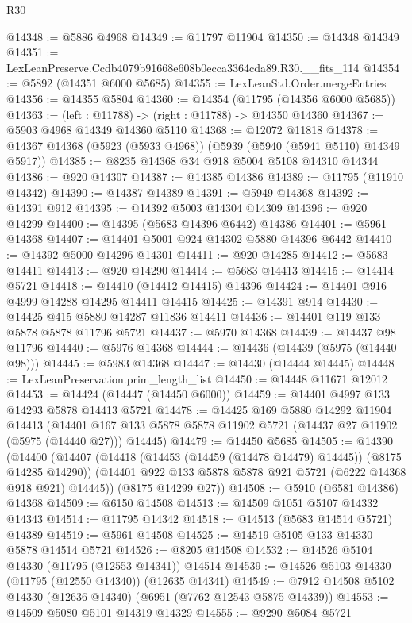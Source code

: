 \begin{lexlean}{R30}
\begin{coremodule}
@14348 := @5886 @4968
@14349 := @11797 @11904
@14350 := @14348 @14349
@14351 := LexLeanPreserve.Ccdb4079b91668e608b0ecca3364cda89.R30.__fits_114
@14354 := @5892 (@14351 @6000 @5685)
@14355 := LexLeanStd.Order.mergeEntries
@14356 := @14355 @5804
@14360 := @14354 (@11795 (@14356 @6000 @5685))
@14363 := (left : @11788) -> (right : @11788) -> @14350 @14360
@14367 := @5903 @4968 @14349 @14360 @5110
@14368 := @12072 @11818
@14378 := @14367 @14368 (@5923 (@5933 @4968)) (@5939 (@5940 (@5941 @5110) @14349 @5917))
@14385 := @8235 @14368 @34 @918 @5004 @5108 @14310 @14344
@14386 := @920 @14307
@14387 := @14385 @14386
@14389 := @11795 (@11910 @14342)
@14390 := @14387 @14389
@14391 := @5949 @14368
@14392 := @14391 @912
@14395 := @14392 @5003 @14304 @14309
@14396 := @920 @14299
@14400 := @14395 (@5683 @14396 @6442) @14386
@14401 := @5961 @14368
@14407 := @14401 @5001 @924 @14302 @5880 @14396 @6442
@14410 := @14392 @5000 @14296 @14301
@14411 := @920 @14285
@14412 := @5683 @14411
@14413 := @920 @14290
@14414 := @5683 @14413
@14415 := @14414 @5721
@14418 := @14410 (@14412 @14415) @14396
@14424 := @14401 @916 @4999 @14288 @14295 @14411 @14415
@14425 := @14391 @914
@14430 := @14425 @415 @5880 @14287 @11836 @14411
@14436 := @14401 @119 @133 @5878 @5878 @11796 @5721
@14437 := @5970 @14368
@14439 := @14437 @98 @11796
@14440 := @5976 @14368
@14444 := @14436 (@14439 (@5975 (@14440 @98)))
@14445 := @5983 @14368
@14447 := @14430 (@14444 @14445)
@14448 := LexLeanPreservation.prim_length_list
@14450 := @14448 @11671 @12012
@14453 := @14424 (@14447 (@14450 @6000))
@14459 := @14401 @4997 @133 @14293 @5878 @14413 @5721
@14478 := @14425
    @169
    @5880
    @14292
    @11904
    @14413
    (@14401 @167 @133 @5878 @5878 @11902 @5721 (@14437 @27 @11902 (@5975 (@14440 @27))) @14445)
@14479 := @14450 @5685
@14505 := @14390
    (@14400
      (@14407
        (@14418 (@14453 (@14459 (@14478 @14479) @14445)) (@8175 @14285 @14290))
        (@14401 @922 @133 @5878 @5878 @921 @5721 (@6222 @14368 @918 @921) @14445))
      (@8175 @14299 @27))
@14508 := @5910 (@6581 @14386) @14368
@14509 := @6150 @14508
@14513 := @14509 @1051 @5107 @14332 @14343
@14514 := @11795 @14342
@14518 := @14513 (@5683 @14514 @5721) @14389
@14519 := @5961 @14508
@14525 := @14519 @5105 @133 @14330 @5878 @14514 @5721
@14526 := @8205 @14508
@14532 := @14526 @5104 @14330 (@11795 (@12553 @14341)) @14514
@14539 := @14526 @5103 @14330 (@11795 (@12550 @14340)) (@12635 @14341)
@14549 := @7912 @14508 @5102 @14330 (@12636 @14340) (@6951 (@7762 @12543 @5875 @14339))
@14553 := @14509 @5080 @5101 @14319 @14329
@14555 := @9290 @5084 @5721

\end{coremodule}
\end{lexlean}
